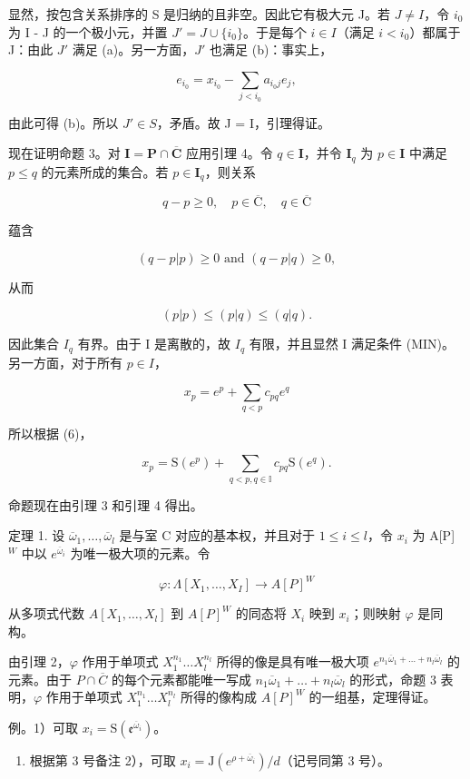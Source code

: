 显然，按包含关系排序的 S 是归纳的且非空。因此它有极大元 J。若 \(J \neq I\)，令 \(i_{0}\) 为 I - J 的一个极小元，并置 \(J' = J \cup \{i_{0}\}\)。于是每个 \(i \in I\)（满足 \(i < i_{0}\)）都属于 J：由此 \(J'\) 满足 (a)。另一方面，\(J'\) 也满足 (b)：事实上，

\[
e _ {i _ {0}} = x _ {i _ {0}} - \sum_ {j <   i _ {0}} a _ {i _ {0} j} e _ {j},
\]

由此可得 (b)。所以 \(J' \in S\)，矛盾。故 J = I，引理得证。

现在证明命题 3。对 \(\mathbf{I} = \mathbf{P} \cap \overline{\mathbf{C}}\) 应用引理 4。令 \(q \in \mathbf{I}\)，并令 \(\mathbf{I}_q\) 为 \(p \in \mathbf{I}\) 中满足 \(p \leqslant q\) 的元素所成的集合。若 \(p \in \mathbf{I}_q\)，则关系

\[
q - p \geqslant 0, \quad p \in \overline {{\mathrm{C}}}, \quad q \in \overline {{\mathrm{C}}}
\]

蕴含

\[
(q - p | p) \geqslant 0 \text { and } (q - p | q) \geqslant 0,
\]

从而

\[
(p | p) \leqslant (p | q) \leqslant (q | q).
\]

因此集合 \(I_{q}\) 有界。由于 I 是离散的，故 \(I_{q}\) 有限，并且显然 I 满足条件 (MIN)。另一方面，对于所有 \(p \in I\)，

\[
x _ {p} = e ^ {p} + \sum_ {q <   p} c _ {p q} e ^ {q}
\]

所以根据 (6)，

\[
x _ {p} = \mathrm{S} (e ^ {p}) + \sum_ {q <   p, q \in \mathbb {I}} c _ {p q} \mathrm{S} (e ^ {q}).
\]

命题现在由引理 3 和引理 4 得出。

定理 1. 设 \(\overline{\omega}_1, \ldots, \overline{\omega}_l\) 是与室 C 对应的基本权，并且对于 \(1 \leqslant i \leqslant l\)，令 \(x_i\) 为 A{[}P{]} \(^W\) 中以 \(e^{\overline{\omega}_i}\) 为唯一极大项的元素。令

\[
\varphi : \Lambda [ X _ {1}, \dots , X _ {I} ] \rightarrow A [ P ] ^ {W}
\]

从多项式代数 \(A[X_{1},\ldots,X_{l}]\) 到 \(A[P]^{W}\) 的同态将 \(X_{i}\) 映到 \(x_{i}\)；则映射 \(\varphi\) 是同构。

由引理 2，\(\varphi\) 作用于单项式 \(X_{1}^{n_{1}}\ldots X_{l}^{n_{l}}\) 所得的像是具有唯一极大项 \(e^{n_1\overline{\omega}_1 + \dots +n_l\overline{\omega}_l}\) 的元素。由于 \(P\cap \overline{C}\) 的每个元素都能唯一写成 \(n_1\overline{\omega}_1 + \dots +n_l\overline{\omega}_l\) 的形式，命题 3 表明，\(\varphi\) 作用于单项式 \(X_{1}^{n_{1}}\ldots X_{l}^{n_{l}}\) 所得的像构成 \(A[P]^W\) 的一组基，定理得证。

例。1）可取 \(x_{i} = \mathrm{S}(\mathfrak{e}^{\overline{\omega}_i})\)。

\begin{enumerate}
\def\labelenumi{\arabic{enumi})}
\setcounter{enumi}{1}
\tightlist
\item
  根据第 3 号备注 2），可取 \(x_{i} = \mathrm{J}(e^{\rho +\overline{\omega}_i}) / d\)（记号同第 3 号）。
\end{enumerate}

